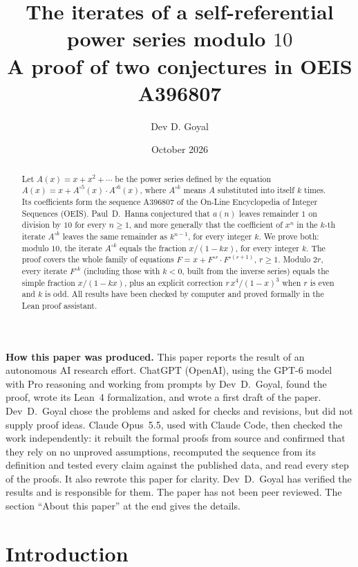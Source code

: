 \documentclass[11pt,a4paper]{article}
\title{The iterates of a self-referential power series modulo $10$\\[6pt]\large A proof of two conjectures in OEIS A396807}
\author{Dev D. Goyal}
\date{October 2026}
\theoremstyle{definition}
\theoremstyle{remark}
\begin{document}
\maketitle
\begin{abstract}
Let $A(x)=x+x^2+\cdots$ be the power series defined by the equation
$A(x)=x+A^{\circ5}(x)\cdot A^{\circ6}(x)$, where $A^{\circ k}$ means $A$ substituted into
itself $k$ times. Its coefficients form the sequence A396807 of the On-Line Encyclopedia of Integer Sequences
(OEIS). Paul~D.~Hanna conjectured that $a(n)$ leaves remainder $1$ on division by $10$ for every $n\ge1$, and more generally
that the coefficient of $x^n$ in the $k$-th iterate $A^{\circ k}$ leaves the same remainder as $k^{n-1}$, for every
integer $k$. We prove both: modulo $10$, the iterate $A^{\circ k}$ equals the fraction $x/(1-kx)$, for every integer
$k$. The proof covers the whole family of
equations $F=x+F^{\circ r}\cdot F^{\circ(r+1)}$, $r\ge1$. Modulo $2r$, every iterate $F^{\circ k}$ (including those
with $k<0$, built from the inverse series) equals the simple fraction $x/(1-kx)$, plus an explicit correction
$r\,x^4/(1-x)^3$ when $r$ is even and $k$ is odd. All results have been checked by computer and proved formally in the
Lean proof assistant.
\end{abstract}
\begin{center}\begin{minipage}{0.88\linewidth}\small
\textbf{How this paper was produced.} This paper reports the result of an autonomous AI research effort.
ChatGPT (OpenAI), using the GPT-6 model with Pro reasoning and working from prompts by Dev~D.~Goyal, found the proof, wrote its Lean~4 formalization, and wrote a first draft of the paper.
Dev~D.~Goyal chose the problems and asked for checks and revisions, but did not supply proof ideas.
Claude Opus~5.5, used with Claude Code, then checked the work independently: it rebuilt the formal proofs from
source and confirmed that they rely on no unproved assumptions, recomputed the sequence from its definition and tested
every claim against the published data, and read every step of the proofs. It also rewrote this paper for clarity.
Dev~D.~Goyal has verified the results and is responsible for them. The paper has not been peer reviewed.
The section ``About this paper'' at the end gives the details.
\end{minipage}\end{center}

\section{Introduction}
\end{document}
